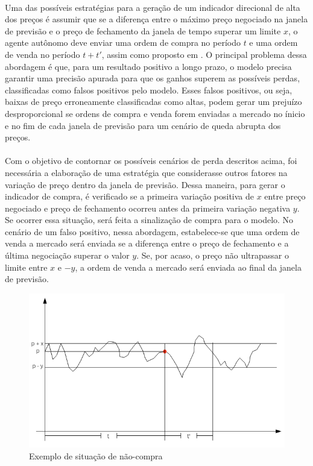 \documentclass[grad,numbers]{coppe}
\begin{document}
            \paragraph{}Uma das possíveis estratégias para a geração de um indicador direcional de alta dos preços é assumir que se a diferença entre o máximo preço negociado na janela de previsão e o preço de fechamento da janela de tempo superar um limite $x$, o agente autônomo deve enviar uma ordem de compra no período $t$ e uma ordem de venda no período $t+t'$, assim como proposto em \citet{everton-silva-master}. O principal problema dessa abordagem é que, para um resultado positivo a longo prazo, o modelo precisa garantir uma precisão apurada para que os ganhos superem as possíveis perdas, classificadas como falsos positivos pelo modelo. Esses falsos positivos, ou seja, baixas de preço erroneamente classificadas como altas, podem gerar um prejuízo desproporcional se ordens de compra e venda forem enviadas a mercado no ínicio e no fim de cada janela de previsão para um cenário de queda abrupta dos preços.
            
            \paragraph{}Com o objetivo de contornar os possíveis cenários de perda descritos acima, foi necessária a elaboração de uma estratégia que considerasse outros fatores na variação de preço dentro da janela de previsão. Dessa maneira, para gerar o indicador de compra, é verificado se a primeira variação positiva de $x$ entre preço negociado e preço de fechamento ocorreu antes da primeira variação negativa $y$. Se ocorrer essa situação, será feita a sinalização de compra para o modelo. No cenário de um falso positivo, nessa abordagem, estabelece-se que uma ordem de venda a mercado será enviada se a diferença entre o preço de fechamento e a última negociação superar o valor $y$. Se, por acaso, o preço não ultrapassar o limite entre $x$ e $-y$, a ordem de venda a mercado será enviada ao final da janela de previsão.
            
            \begin{figure}[h]
                \caption{Exemplo de situação de não-compra}
                \label{img:estrategia-saida}
                \includegraphics[width=13cm]{estrategia-saida1.png}
                \centering
            \end{figure}
            
\end{document}
